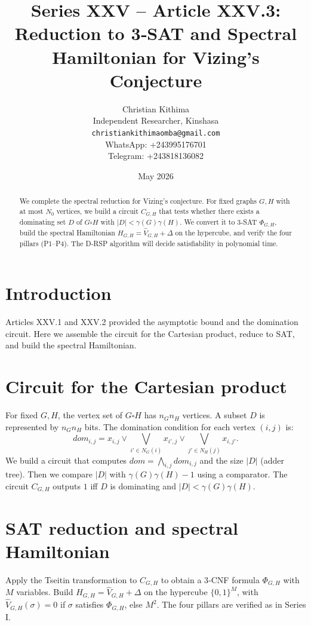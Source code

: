 \documentclass[11pt,a4paper]{article}
\title{Series XXV – Article XXV.3: Reduction to 3‑SAT and Spectral Hamiltonian for Vizing's Conjecture}
\author{Christian Kithima \\
Independent Researcher, Kinshasa \\
\texttt{christiankithimaomba@gmail.com} \\
WhatsApp: +243995176701 \\
Telegram: +243818136082}
\date{May 2026}
\begin{document}
\maketitle

\begin{abstract}
We complete the spectral reduction for Vizing's conjecture. For fixed graphs $G,H$ with at most $N_0$ vertices, we build a circuit $C_{G,H}$ that tests whether there exists a dominating set $D$ of $G\square H$ with $|D| < \gamma(G)\gamma(H)$. We convert it to 3‑SAT $\Phi_{G,H}$, build the spectral Hamiltonian $H_{G,H} = \hat{V}_{G,H} + \Delta$ on the hypercube, and verify the four pillars (P1–P4). The D‑RSP algorithm will decide satisfiability in polynomial time.
\end{abstract}

\tableofcontents

\section{Introduction}
Articles XXV.1 and XXV.2 provided the asymptotic bound and the domination circuit. Here we assemble the circuit for the Cartesian product, reduce to SAT, and build the spectral Hamiltonian.

\section{Circuit for the Cartesian product}
For fixed $G,H$, the vertex set of $G\square H$ has $n_G n_H$ vertices. A subset $D$ is represented by $n_G n_H$ bits. The domination condition for each vertex $(i,j)$ is:
\[
dom_{i,j} = x_{i,j} \lor \bigvee_{i'\in N_G(i)} x_{i',j} \lor \bigvee_{j'\in N_H(j)} x_{i,j'}.
\]
We build a circuit that computes $dom = \bigwedge_{i,j} dom_{i,j}$ and the size $|D|$ (adder tree). Then we compare $|D|$ with $\gamma(G)\gamma(H)-1$ using a comparator. The circuit $C_{G,H}$ outputs $1$ iff $D$ is dominating and $|D| < \gamma(G)\gamma(H)$.

\section{SAT reduction and spectral Hamiltonian}
Apply the Tseitin transformation to $C_{G,H}$ to obtain a 3‑CNF formula $\Phi_{G,H}$ with $M$ variables. Build $H_{G,H} = \hat{V}_{G,H} + \Delta$ on the hypercube $\{0,1\}^M$, with $\hat{V}_{G,H}(\sigma)=0$ if $\sigma$ satisfies $\Phi_{G,H}$, else $M^2$. The four pillars are verified as in Series I.
\end{document}
